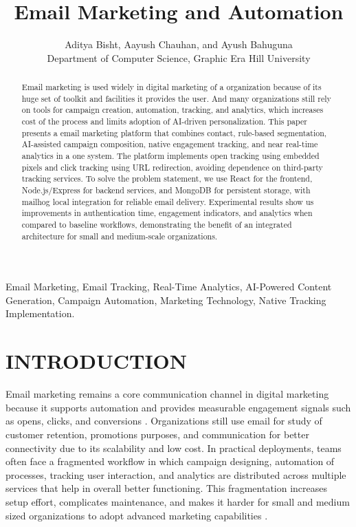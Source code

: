 \documentclass[12pt,journal,compsoc]{IEEEtran}
\title{Email Marketing and Automation}
\author{Aditya Bisht, Aayush Chauhan, and Ayush Bahuguna\\
Department of Computer Science, Graphic Era Hill University}
\begin{document}
\maketitle

\begin{abstract}
Email marketing is used widely in digital marketing of a organization because of its huge set of toolkit and facilities it provides the user. And many organizations still rely on tools for campaign creation, automation, tracking, and analytics, which increases cost of the process and limits adoption of AI-driven personalization. This paper presents a email marketing platform that combines contact, rule-based segmentation, AI-assisted campaign composition, native engagement tracking, and near real-time analytics in a one system. The platform implements open tracking using embedded pixels and click tracking using URL redirection, avoiding dependence on third-party tracking services. To solve the problem statement, we use React for the frontend, Node.js/Express for backend services, and MongoDB for persistent storage, with mailhog local integration for reliable email delivery. Experimental results show us improvements in authentication time, engagement indicators, and analytics when compared to baseline workflows, demonstrating the benefit of an integrated architecture for small and medium-scale organizations.
\end{abstract}

\begin{IEEEkeywords}
Email Marketing, Email Tracking, Real-Time Analytics, AI-Powered Content Generation, Campaign Automation, Marketing Technology, Native Tracking Implementation.
\end{IEEEkeywords}

\section{INTRODUCTION}
Email marketing remains a core communication channel in digital marketing because it supports automation and provides measurable engagement signals such as opens, clicks, and conversions \cite{ref1}. Organizations still use email for study of customer retention, promotions purposes, and communication for better connectivity due to its scalability and low cost. In practical deployments, teams often face a fragmented workflow in which campaign designing, automation of processes, tracking user interaction, and analytics are distributed across multiple services that help in overall better functioning. This fragmentation increases setup effort, complicates maintenance, and makes it harder for small and medium sized organizations to adopt advanced marketing capabilities \cite{ref2,ref3}.
\end{document}
